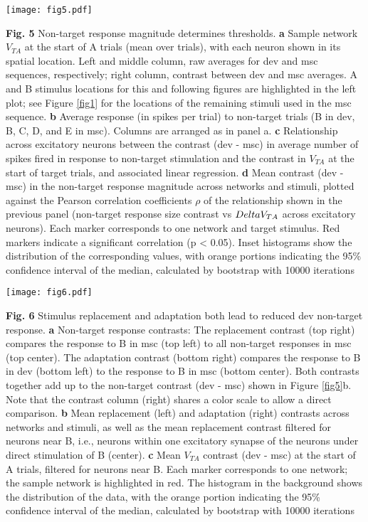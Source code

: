 \documentclass[pdflatex,referee,iicol,sn-basic]{sn-jnl}
\theoremstyle{thmstyleone}%
\theoremstyle{thmstyletwo}%
\theoremstyle{thmstylethree}%
\begin{document}
\begin{figure*}%
    \centering
    \texttt{[image: fig5.pdf]}
    \caption{}
    \label{fig5}
\end{figure*}
\textbf{Fig. 5} Non-target response magnitude determines thresholds.
\textbf{a} Sample network $V_{TA}$ at the start of A trials (mean over trials), with each neuron shown in its spatial location. Left and middle column, raw averages for dev and msc sequences, respectively; right column, contrast between dev and msc averages. A and B stimulus locations for this and following figures are highlighted in the left plot; see Figure \ref{fig1} for the locations of the remaining stimuli used in the msc sequence.
\textbf{b} Average response (in spikes per trial) to non-target trials (B in dev, B, C, D, and E in msc). Columns are arranged as in panel a.
\textbf{c} Relationship across excitatory neurons between the contrast (dev - msc) in average number of spikes fired in response to non-target stimulation and the contrast in $V_{TA}$ at the start of target trials, and associated linear regression.
\textbf{d} Mean contrast (dev - msc) in the non-target response magnitude across networks and stimuli, plotted against the Pearson correlation coefficients $\rho$ of the relationship shown in the previous panel (non-target response size contrast vs $\\Delta V_{TA}$ across excitatory neurons). Each marker corresponds to one network and target stimulus. Red markers indicate a significant correlation (p < 0.05). Inset histograms show the distribution of the corresponding values, with orange portions indicating the 95\% confidence interval of the median, calculated by bootstrap with 10000 iterations

\begin{figure*}%
    \centering
    \texttt{[image: fig6.pdf]}
    \caption{}
    \label{fig6}
\end{figure*}
\textbf{Fig. 6} Stimulus replacement and adaptation both lead to reduced dev non-target response.
\textbf{a} Non-target response contrasts: The replacement contrast (top right) compares the response to B in msc (top left) to all non-target responses in msc (top center). The adaptation contrast (bottom right) compares the response to B in dev (bottom left) to the response to B in msc (bottom center). Both contrasts together add up to the non-target contrast (dev - msc) shown in Figure \ref{fig5}b. Note that the contrast column (right) shares a color scale to allow a direct comparison.
\textbf{b} Mean replacement (left) and adaptation (right) contrasts across networks and stimuli, as well as the mean replacement contrast filtered for neurons near B, i.e., neurons within one excitatory synapse of the neurons under direct stimulation of B (center).
\textbf{c} Mean $V_{TA}$ contrast (dev - msc) at the start of A trials, filtered for neurons near B. Each marker corresponds to one network; the sample network is highlighted in red. The histogram in the background shows the distribution of the data, with the orange portion indicating the 95\% confidence interval of the median, calculated by bootstrap with 10000 iterations
\end{document}
